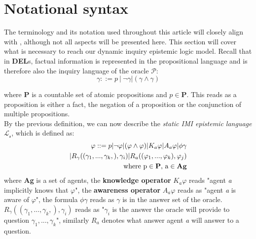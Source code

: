 \section{Notational syntax}
The terminology and its notation used throughout this article will closely align with \cite{delimi}, although not all aspects will be presented here. This section will cover what is necessary to reach our dynamic inquiry epistemic logic model. Recall that in \textbf{DEL}s, factual information is represented in the propositional language and is therefore also the inquiry language of the oracle $\mathscr{P}$:
$$
	\gamma::= p\:|\:\neg\gamma|(\gamma\land\gamma)
$$

where \textbf{P} is a countable set of atomic propositions and $p \in \mathbf{P}$. This reads as a proposition is either a fact, the negation of a proposition or the conjunction of multiple propositions.\\
By the previous definition, we can now describe the \textit{static IMI epistemic language} $\mathscr{L_s}$, which is defined as:
\begin{align*}
	\varphi ::= p |\neg\varphi|(\varphi \land \varphi) | K_a\varphi | A_a\varphi | \phi\gamma \\| R_\gamma((\gamma_1,...,\gamma_k,), \gamma_i) | R_a((\varphi_1,...,\varphi_k), \varphi_j) \\ \text{where p} \in \text{\textbf{P}}\text{, a} \in \text{\textbf{Ag}}
\end{align*}
where \textbf{Ag} is a set of agents, the \textbf{knowledge operator} $K_a\varphi$ reads "agent \textit{a} implicitly knows that $\varphi$", the \textbf{awareness operator} $A_a\varphi$ reads as "agent \textit{a} is aware of $\varphi$", the formula $\phi\gamma$ reads as $\gamma$ is in the answer set of the oracle. $R_\gamma((\gamma_1,...,\gamma_k,), \gamma_i)$ reads as "$\gamma_i$ is the answer the oracle will provide to question $\gamma_1,...,\gamma_k$", similarly $R_a$ denotes what answer agent \textit{a} will answer to a question. 

